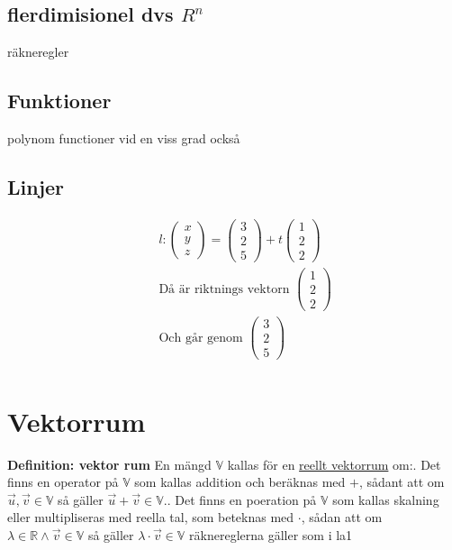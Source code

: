 \begin{multicols}{2}
\subsection{flerdimisionel dvs $R^n$}
räkneregler

\subsection{Funktioner}
polynom functioner vid en viss grad också

\subsection{Linjer}
\begin{align*}
  &\quad  l: \begin{pmatrix} x \\ y \\ z \end{pmatrix} =
  \begin{pmatrix} 3 \\ 2 \\ 5 \end{pmatrix} + t\begin{pmatrix} 1 \\ 2 \\ 2 \end{pmatrix} \\
  &\quad  \text{Då är riktnings vektorn } \begin{pmatrix} 1 \\ 2 \\ 2 \end{pmatrix} \\
  &\quad  \text{Och går genom } \begin{pmatrix} 3 \\ 2 \\ 5 \end{pmatrix} \\
\end{align*}


\section{Vektorrum}
\textbf{Definition: vektor rum}
En mängd $\mathbb{V}$ kallas för en \underline{reellt vektorrum} om:. Det finns en operator på  $\mathbb{V}$ som kallas addition och
beräknas med $+$, sådant att om $\vec{u},\vec{v} \in \mathbb{V}$ så gäller
$\vec{u}+\vec{v}\in\mathbb{V}$.. Det finns en poeration på  $\mathbb{V}$ som kallas skalning eller
multipliseras med reella tal, som beteknas med $\cdot$, sådan
att om $\lambda\in\mathbb{R} \land \vec{v}\in\mathbb{V}$ så gäller
$\lambda\cdot\vec{v}\in\mathbb{V}$
räknereglerna gäller som i la1


\end{multicols}
